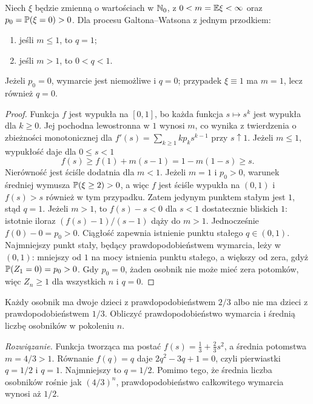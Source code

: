 \begin{twierdzenie}
Niech $\xi$ będzie zmienną o wartościach w $\mathbb{N}_0$, z
$0<m=\mathbb{E}\xi<\infty$ oraz $p_0=\mathbb{P}(\xi=0)>0$.
Dla procesu Galtona--Watsona z jednym przodkiem:
\begin{enumerate}
\item jeśli $m\le1$, to $q=1$;
\item jeśli $m>1$, to $0<q<1$.
\end{enumerate}
Jeżeli $p_0=0$, wymarcie jest niemożliwe i $q=0$;
przypadek $\xi\equiv1$ ma $m=1$, lecz również $q=0$.
\end{twierdzenie}
\begin{proof}
Funkcja $f$ jest wypukła na $[0,1]$, bo każda
funkcja $s\mapsto s^k$ jest wypukła dla $k\ge0$.
Jej pochodna lewostronna w $1$ wynosi $m$, co wynika
z twierdzenia o zbieżności monotonicznej dla
$f'(s)=\sum_{k\ge1}kp_ks^{k-1}$ przy $s\uparrow1$.
Jeżeli $m\le1$, wypukłość daje dla $0\le s<1$
\[
f(s)\ge f(1)+m(s-1)=1-m(1-s)\ge s.
\]
Nierówność jest ściśle dodatnia dla $m<1$.
Jeżeli $m=1$ i $p_0>0$, warunek średniej wymusza
$\mathbb{P}(\xi\ge2)>0$, a więc $f$ jest ściśle wypukła
na $(0,1)$ i $f(s)>s$ również w tym przypadku.
Zatem jedynym punktem stałym jest $1$, stąd $q=1$.
Jeżeli $m>1$, to
$f(s)-s<0$ dla $s<1$ dostatecznie bliskich $1$:
istotnie iloraz $(f(s)-1)/(s-1)$ dąży do $m>1$.
Jednocześnie $f(0)-0=p_0>0$.
Ciągłość zapewnia istnienie punktu stałego $q\in(0,1)$.
Najmniejszy punkt stały, będący prawdopodobieństwem wymarcia,
leży w $(0,1)$: mniejszy od $1$ na mocy istnienia punktu stałego,
a większy od zera, gdyż $\mathbb{P}(Z_1=0)=p_0>0$.
Gdy $p_0=0$, żaden osobnik nie może mieć zera potomków,
więc $Z_n\ge1$ dla wszystkich $n$ i $q=0$.
\end{proof}

\begin{zadanie}
Każdy osobnik ma dwoje dzieci z prawdopodobieństwem $2/3$
albo nie ma dzieci z prawdopodobieństwem $1/3$.
Obliczyć prawdopodobieństwo wymarcia i średnią liczbę
osobników w pokoleniu $n$.

\emph{Rozwiązanie.} Funkcja tworząca ma postać
$f(s)=\frac13+\frac23s^2$, a średnia potomstwa
$m=4/3>1$. Równanie $f(q)=q$ daje
$2q^2-3q+1=0$, czyli pierwiastki $q=1/2$ i $q=1$.
Najmniejszy to $q=1/2$. Pomimo tego, że średnia
liczba osobników rośnie jak $(4/3)^n$, prawdopodobieństwo
całkowitego wymarcia wynosi aż $1/2$.
\end{zadanie}


